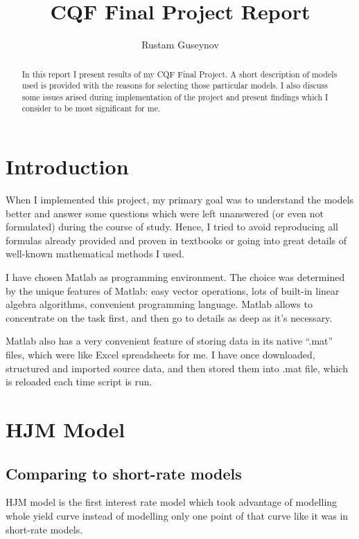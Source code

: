 \documentclass[11pt]{article} %
\title{CQF Final Project Report}
\author{Rustam Guseynov}
\begin{document}
\maketitle
\begin{abstract}
In this report I present results of my CQF Final Project. A short description of models used is provided with the reasons for selecting those particular models. I also discuss some issues arised during implementation of the project and present findings which I consider to be most significant for me. 
\end{abstract}

\section{Introduction}

When I implemented this project, my primary goal was to understand the models better and answer some questions which were left unanswered (or even not formulated) during the course of study. Hence, I tried to avoid reproducing all formulas already provided and proven in textbooks or going into great details of well-known mathematical methods I used.

I have chosen Matlab as programming environment. The choice was determined by the unique features of Matlab: easy vector operations, lots of built-in linear algebra algorithms, convenient programming language.  Matlab allows to concentrate on the task first, and then go to details as deep as it's necessary.

Matlab also has a very convenient feature of storing data in its native ``.mat'' files, which were like Excel spreadsheets for me. I have once downloaded, structured and imported source data, and then stored them into .mat file, which is reloaded each time script is run.
\section{HJM Model}

\subsection{Comparing to short-rate models}

HJM model is the first interest rate model which took advantage of modelling whole yield curve instead of modelling only one point of that curve like it was in short-rate models.
\end{document}
